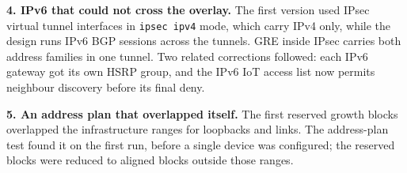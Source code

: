\textbf{4. IPv6 that could not cross the overlay.} The first version used IPsec virtual tunnel interfaces in
\texttt{ipsec ipv4} mode, which carry IPv4 only, while the design runs IPv6 BGP sessions across the tunnels.
GRE inside IPsec carries both address families in one tunnel. Two related corrections followed: each IPv6
gateway got its own HSRP group, and the IPv6 IoT access list now permits neighbour discovery before its final
deny.

\textbf{5. An address plan that overlapped itself.} The first reserved growth blocks overlapped the
infrastructure ranges for loopbacks and links. The address-plan test found it on the first run, before a
single device was configured; the reserved blocks were reduced to aligned blocks outside those ranges.

